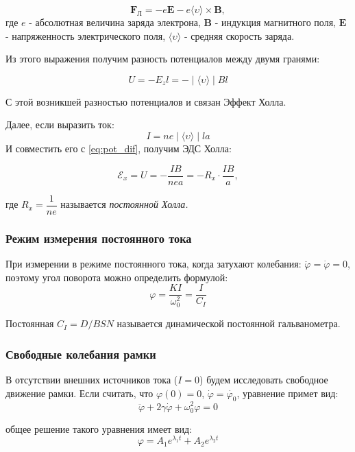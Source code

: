\documentclass[a4paper, 12pt]{article}
\begin{document}
$$\boldsymbol{F_\text{Л}}  = -e \boldsymbol{E} - e \langle \upsilon \rangle \times \boldsymbol{B},$$
где $e$ - абсолютная величина заряда электрона, $\boldsymbol{B}$ - индукция магнитного поля, $\boldsymbol{E}$ - напряженность электрического поля, $ \langle \upsilon \rangle$ - средняя скорость заряда.

Из этого выражения получим разность потенциалов между двумя гранями:

\begin{equation}
U = -E_zl = - \mid \langle \upsilon \rangle \mid B l
\label{eq:pot_dif}
\end{equation}

С этой возникшей разностью потенциалов и связан Эффект Холла.

Далее, если выразить ток:
$$ I = ne \mid  \langle \upsilon \rangle \mid  l a$$
И совместить его с \ref{eq:pot_dif}, получим ЭДС Холла:

\begin{equation}
\mathscr{E}_x = U = - \dfrac{IB}{nea} = -R_x \cdot \dfrac{IB}{a},
\label{eq: Hall}
\end{equation}

где $R_x = \dfrac{1}{ne}$ называется \textit{постоянной Холла.}

\subsubsection*{Режим измерения постоянного тока}
При измерении в режиме постоянного тока, когда затухают колебания: $\ddot{\varphi} = \dot{\varphi} = 0$, поэтому угол поворота можно определить формулой:
$$\varphi = \dfrac{KI}{\omega_0^2} = \dfrac{I}{C_I}$$

Постоянная $C_I = D/BSN$ называется динамической постоянной гальванометра.

\subsubsection*{Свободные колебания рамки}

В отсутствии внешних источников тока ($I = 0$) будем исследовать свободное движение рамки.
Если считать, что $\varphi(0) = 0$, $\dot{\varphi} = \dot{\varphi_0}$, уравнение примет вид:
$$\ddot{\varphi} +2 \gamma \dot{\varphi} + \omega^2_0 \varphi = 0$$

общее решение такого уравнения имеет вид:
\begin{equation}
\varphi = A_1 e^{\lambda_1t} + A_2e^{\lambda_2t}
\label{eq:sol}
\end{equation}
\end{document}
